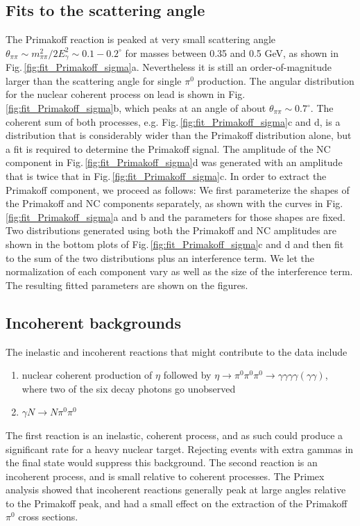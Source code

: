 \subsection{Fits to the scattering angle}
The Primakoff reaction is peaked at very small scattering angle $\theta_{\pi\pi} \sim m_{\pi\pi}^2 / 2E_\gamma^2 \sim 0.1-0.2^\circ$ for masses between 0.35 and 0.5 GeV, as shown in 
Fig.\,\ref{fig:fit_Primakoff_sigma}a.  Nevertheless it is still an
order-of-magnitude larger than the scattering angle for single $\pi^0$ production. The angular distribution for the nuclear coherent process on lead is shown in Fig.\,\ref{fig:fit_Primakoff_sigma}b, which 
peaks at an angle of about $\theta_{\pi\pi} \sim 0.7^\circ$. The coherent sum of both processes, e.g. Fig.\,\ref{fig:fit_Primakoff_sigma}c and d, is a distribution that is considerably wider than the 
Primakoff distribution alone, but a fit is required to determine the Primakoff signal. The amplitude of the NC component in Fig.\,\ref{fig:fit_Primakoff_sigma}d was generated with an amplitude that
is twice that in Fig.\,\ref{fig:fit_Primakoff_sigma}c.  In order to extract the Primakoff component, we proceed as follows: We first parameterize the shapes of the Primakoff and
NC components separately, as shown with the curves in Fig.\,\ref{fig:fit_Primakoff_sigma}a and b and the parameters for those shapes are fixed. Two distributions generated using both the Primakoff and
NC amplitudes are shown in the bottom plots of Fig.\,\ref{fig:fit_Primakoff_sigma}c and d and then fit to the sum of the two distributions plus an interference term. We let the normalization of each
component vary as well as the size of the interference term. The resulting fitted parameters are shown on the figures. 
  

\subsection{Incoherent backgrounds}


The inelastic and incoherent reactions that might contribute to the
data include
\begin{enumerate}[label=(\roman*)]
    \item nuclear coherent production of $\eta$ followed by $\eta\rightarrow \pi^0\pi^0\pi^0 \rightarrow \gamma\gamma\gamma\gamma(\gamma\gamma)$, where two of the six decay photons go unobserved
    \item $\gamma N \rightarrow N \pi^0\pi^0$
\end{enumerate}

The first reaction is an inelastic, coherent process, and as such
could produce a significant rate for a heavy nuclear target. Rejecting
events with extra gammas in the final state would suppress this
background.  The second reaction is an incoherent process, and is
small relative to coherent processes.  The Primex analysis showed that
incoherent reactions generally peak at large angles relative to the
Primakoff peak, and had a small effect on the extraction of the
Primakoff $\pi^0$ cross sections.